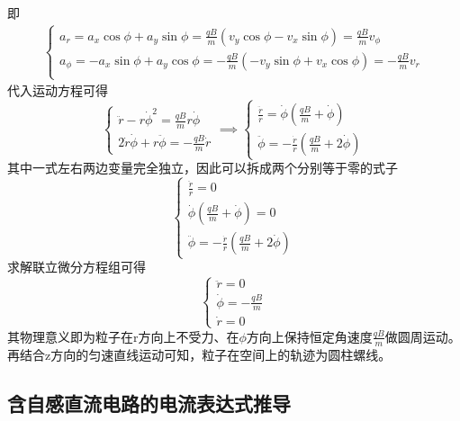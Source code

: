即
\begin{align*}
    \begin{cases}
        a_r=a_x\cos\phi+a_y\sin\phi
        =\frac{qB}{m}\left(v_y\cos\phi-v_x\sin\phi\right)
        =\frac{qB}{m}v_\phi\\
        a_\phi=-a_x\sin\phi+a_y\cos\phi
        =-\frac{qB}{m}\left(-v_y\sin\phi+v_x\cos\phi\right)
        =-\frac{qB}{m}v_r\\
    \end{cases}
\end{align*}
代入运动方程可得
\begin{equation*}
    \begin{cases}
        \ddot{r}-r\dot{\phi}^2=\frac{qB}{m}r\dot{\phi}\\
        2\dot{r}\dot{\phi}+r\ddot{\phi}=-\frac{qB}{m}\dot{r}
    \end{cases}
    \implies
    \begin{cases}
        \frac{\ddot{r}}{r}=\dot{\phi}\left(\frac{qB}{m}+\dot{\phi}\right)\\
        \ddot{\phi}=-\frac{\dot{r}}{r}\left(\frac{qB}{m}+2\dot{\phi}\right)
    \end{cases}
\end{equation*}
其中一式左右两边变量完全独立，因此可以拆成两个分别等于零的式子
\begin{equation*}
    \begin{cases}
        \frac{\ddot{r}}{r}=0\\
        \dot{\phi}\left(\frac{qB}{m}+\dot{\phi}\right)=0\\
        \ddot{\phi}=-\frac{\dot{r}}{r}\left(\frac{qB}{m}+2\dot{\phi}\right)
    \end{cases}
\end{equation*}
求解联立微分方程组可得
\begin{equation*}
    \begin{cases}
        \ddot{r}=0\\
        \dot{\phi}=-\frac{qB}{m}\\
        \dot{r}=0
    \end{cases}
\end{equation*}
其物理意义即为粒子在r方向上不受力、在$\phi$方向上保持恒定角速度$\frac{qB}{m}$做圆周运动。再结合z方向的匀速直线运动可知，粒子在空间上的轨迹为圆柱螺线。

\subsection{含自感直流电路的电流表达式推导}

